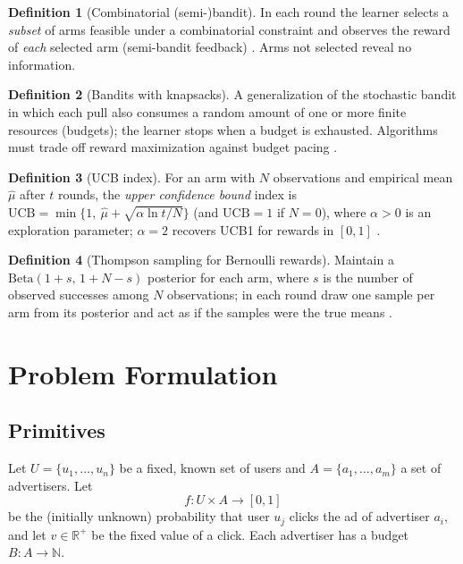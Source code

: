 \documentclass{article}
\theoremstyle{definition}
\newtheorem{definition}{Definition}
\theoremstyle{remark}
\newcommand{\N}{\mathbb{N}}
\newcommand{\R}{\mathbb{R}}
\newcommand{\UCB}{\mathrm{UCB}}
\begin{document}
\begin{definition}[Combinatorial (semi-)bandit]
In each round the learner selects a \emph{subset} of arms feasible under a combinatorial constraint and observes the reward of \emph{each} selected arm (semi-bandit feedback) \citep{chen2013combinatorial}. Arms not selected reveal no information.
\end{definition}

\begin{definition}[Bandits with knapsacks]
A generalization of the stochastic bandit in which each pull also consumes a random amount of one or more finite resources (budgets); the learner stops when a budget is exhausted. Algorithms must trade off reward maximization against budget pacing \citep{badanidiyuru2013bandits}.
\end{definition}

\begin{definition}[UCB index]
For an arm with $N$ observations and empirical mean $\hat\mu$ after $t$ rounds, the \emph{upper confidence bound} index is $\UCB=\min\{1,\ \hat\mu+\sqrt{\alpha\ln t/N}\}$ (and $\UCB=1$ if $N=0$), where $\alpha>0$ is an exploration parameter; $\alpha=2$ recovers UCB1 for rewards in $[0,1]$ \citep{auer2002finite}.
\end{definition}

\begin{definition}[Thompson sampling for Bernoulli rewards]
Maintain a $\mathrm{Beta}(1+s,\,1+N-s)$ posterior for each arm, where $s$ is the number of observed successes among $N$ observations; in each round draw one sample per arm from its posterior and act as if the samples were the true means \citep{thompson1933likelihood,agrawal2012analysis}.
\end{definition}

\section{Problem Formulation}
\label{sec:formulation}

\subsection{Primitives}
Let $U=\{u_1,\dots,u_n\}$ be a fixed, known set of users and $A=\{a_1,\dots,a_m\}$ a set of advertisers. Let
\[
f:U\times A\to[0,1]
\]
be the (initially unknown) probability that user $u_j$ clicks the ad of advertiser $a_i$, and let $v\in\R^+$ be the fixed value of a click. Each advertiser has a budget $B:A\to\N$.
\end{document}
